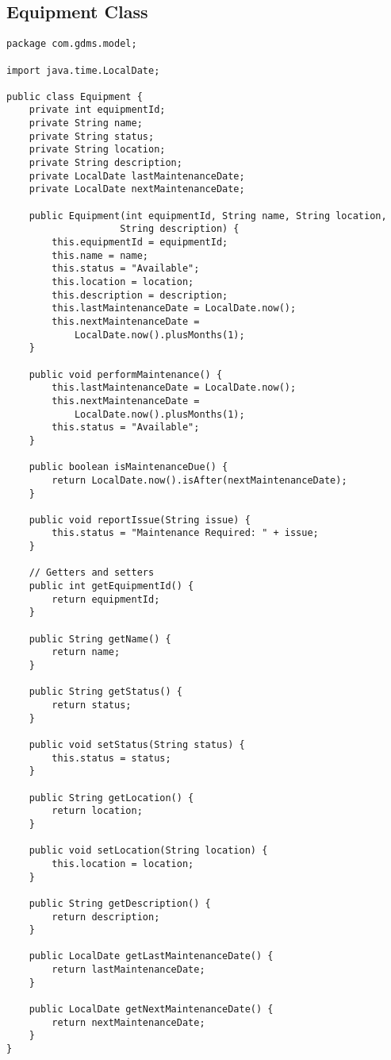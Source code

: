\documentclass[12pt,a4paper]{report}
\begin{document}
\subsection{Equipment Class}
\begin{lstlisting}[caption=Equipment.java]
package com.gdms.model;

import java.time.LocalDate;

public class Equipment {
    private int equipmentId;
    private String name;
    private String status;
    private String location;
    private String description;
    private LocalDate lastMaintenanceDate;
    private LocalDate nextMaintenanceDate;

    public Equipment(int equipmentId, String name, String location, 
                    String description) {
        this.equipmentId = equipmentId;
        this.name = name;
        this.status = "Available";
        this.location = location;
        this.description = description;
        this.lastMaintenanceDate = LocalDate.now();
        this.nextMaintenanceDate = 
            LocalDate.now().plusMonths(1);
    }

    public void performMaintenance() {
        this.lastMaintenanceDate = LocalDate.now();
        this.nextMaintenanceDate = 
            LocalDate.now().plusMonths(1);
        this.status = "Available";
    }

    public boolean isMaintenanceDue() {
        return LocalDate.now().isAfter(nextMaintenanceDate);
    }

    public void reportIssue(String issue) {
        this.status = "Maintenance Required: " + issue;
    }

    // Getters and setters
    public int getEquipmentId() {
        return equipmentId;
    }

    public String getName() {
        return name;
    }

    public String getStatus() {
        return status;
    }

    public void setStatus(String status) {
        this.status = status;
    }

    public String getLocation() {
        return location;
    }

    public void setLocation(String location) {
        this.location = location;
    }

    public String getDescription() {
        return description;
    }

    public LocalDate getLastMaintenanceDate() {
        return lastMaintenanceDate;
    }

    public LocalDate getNextMaintenanceDate() {
        return nextMaintenanceDate;
    }
}
\end{lstlisting}
\end{document}
